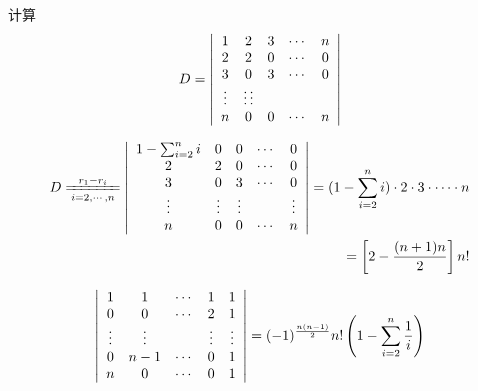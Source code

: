 \begin{frame}
  \begin{li}
    计算
    $$
    D= \left|
      \begin{array}{ccccc}
        1 &  2  & 3   &\cdots & n   \\
        2 &  2  & 0   &\cdots & 0  \\
        3 &  0  & 3   &\cdots & 0  \\
        \vdots & \vdots  \vdots  &    & \\
        n &  0  & 0   &\cdots & n
      \end{array}
    \right|
    $$
  \end{li}
  \begin{jie}
    $$
    \begin{aligned}
      D  \xlongequal[i=2,\cd,n]{r_1-r_i} 
      \left|
        \begin{array}{ccccc}
          1-\sum_{i=2}^n i &  0  & 0   &\cd & 0   \\
          2 &  2  & 0   &\cd & 0  \\
          3 &  0  & 3   &\cd & 0  \\
          \vd & \vd & \vd  &    &\vd  \\
          n &  0  & 0   &\cd & n
        \end{array}
      \right|
      =  (1-\sum_{i=2}^n i) \cdot 2 \cdot 3 \cdot \cd \cdot n\\
      =  \left[2-\frac{(n+1)n}2\right] n!
    \end{aligned}
    $$
  \end{jie}
\end{frame}

\begin{frame}
  \begin{li}
    $$
    \left|
      \begin{array}{ccccc}
        1 & 1 & \cdots & 1 & 1 \\
        0 & 0 & \cdots & 2 & 1 \\
        \vdots & \vdots & & \vdots & \vdots \\
        0 & n-1 & \cdots & 0 & 1 \\
        n & 0 & \cdots & 0 & 1
      \end{array}
    \right|  = (-1)^{\frac{n(n-1)}2} n! \left(1-\sum_{i=2}^n\frac1i\right)
    $$
  \end{li}
\end{frame}

